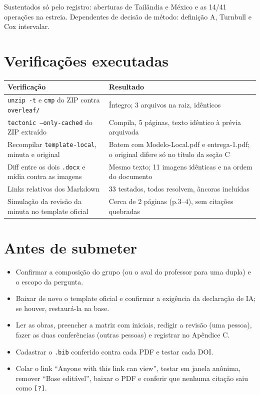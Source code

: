 \documentclass[11pt,a4paper]{article}
\newcommand{\arq}[1]{\nolinkurl{#1}}
\begin{document}
Sustentados só pelo registro: aberturas de Tailândia e México e as 14/41 operações na estreia. Dependentes de decisão de método: definição A, Turnbull e Cox intervalar.

\section{Verificações executadas}

\begin{longtable}{@{}P{6.3cm}P{9.8cm}@{}}
\toprule
Verificação & Resultado \\
\midrule
\endhead
\texttt{unzip -t} e \texttt{cmp} do ZIP contra \arq{overleaf/} & Íntegro; 3 arquivos na raiz, idênticos \\
\texttt{tectonic --only-cached} do ZIP extraído & Compila, 5 páginas, texto idêntico à prévia arquivada \\
Recompilar \arq{template-local}, minuta e original & Batem com Modelo-Local.pdf e entrega-1.pdf; o original difere só no título da seção C \\
Diff entre os dois \texttt{.docx} e mídia contra as imagens & Mesmo texto; 11 imagens idênticas e na ordem do documento \\
Links relativos dos Markdown & 33 testados, todos resolvem, âncoras incluídas \\
Simulação da revisão da minuta no template oficial & Cerca de 2 páginas (p.3--4), sem citações quebradas \\
\bottomrule
\end{longtable}

\section{Antes de submeter}

\begin{itemize}
\item Confirmar a composição do grupo (ou o aval do professor para uma dupla) e o escopo da pergunta.
\item Baixar de novo o template oficial e confirmar a exigência da declaração de IA; se houver, restaurá-la na base.
\item Ler as obras, preencher a matriz com iniciais, redigir a revisão (uma pessoa), fazer as duas conferências (outras pessoas) e registrar no Apêndice C.
\item Cadastrar o \texttt{.bib} conferido contra cada PDF e testar cada DOI.
\item Colar o link ``Anyone with this link can view'', testar em janela anônima, remover ``Base editável'', baixar o PDF e conferir que nenhuma citação saiu como \texttt{[?]}.
\end{itemize}
\end{document}
